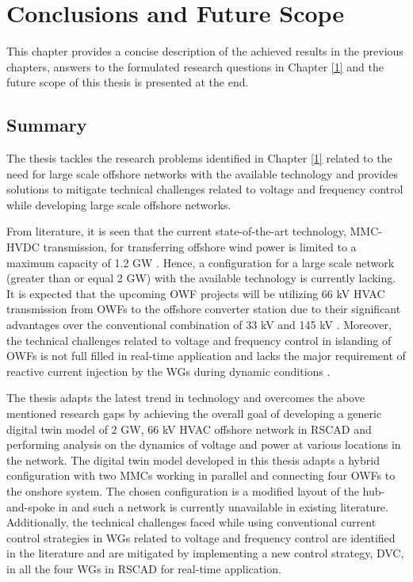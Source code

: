 \chapter{Conclusions and Future Scope}\label{6}

This chapter provides a concise description of the achieved results in the previous chapters, answers to the formulated research questions in Chapter \ref{1} and the future scope of this thesis is presented at the end.

\section{Summary}
The thesis tackles the research problems identified in Chapter \ref{1} related to the need for large scale offshore networks with the available technology and provides solutions to mitigate technical challenges related to voltage and frequency control while developing large scale offshore networks.

From literature, it is seen that the current state-of-the-art technology, \gls{MMC}-\gls{HVDC} transmission, for transferring offshore wind power is limited to a maximum capacity of 1.2 GW \cite{peralta2012detailed}. Hence, a configuration for a large scale network (greater than or equal 2 GW) with the available technology is currently lacking. It is expected that the upcoming \gls{OWF} projects will be utilizing 66 kV \gls{HVAC} transmission from \gls{OWF}s to the offshore converter station due to their significant advantages over the conventional combination of 33 kV and 145 kV \cite{dnv66kv}. Moreover, the technical challenges related to voltage and frequency control in islanding of \gls{OWF}s is not full filled in real-time application and lacks the major requirement of reactive current injection by the \gls{WG}s during dynamic conditions \cite{sethi_real-time_nodate-new}.

The thesis adapts the latest trend in technology and overcomes the above mentioned research gaps by achieving the overall goal of developing a generic digital twin model of 2 GW, 66 kV \gls{HVAC} offshore network in RSCAD and performing analysis on the dynamics of voltage and power at various locations in the network. The digital twin model developed in this thesis adapts a hybrid configuration with two \gls{MMC}s working in parallel and connecting four \gls{OWF}s to the onshore system. The chosen configuration is a modified layout of the hub-and-spoke in \cite{abb_hvdc_2018} and such a network is currently unavailable in existing literature. Additionally, the technical challenges faced while using conventional current control strategies in \gls{WG}s related to voltage and frequency control are identified in the literature and are mitigated by implementing a new control strategy, \gls{DVC}, in all the four \gls{WG}s in RSCAD for real-time application. 


